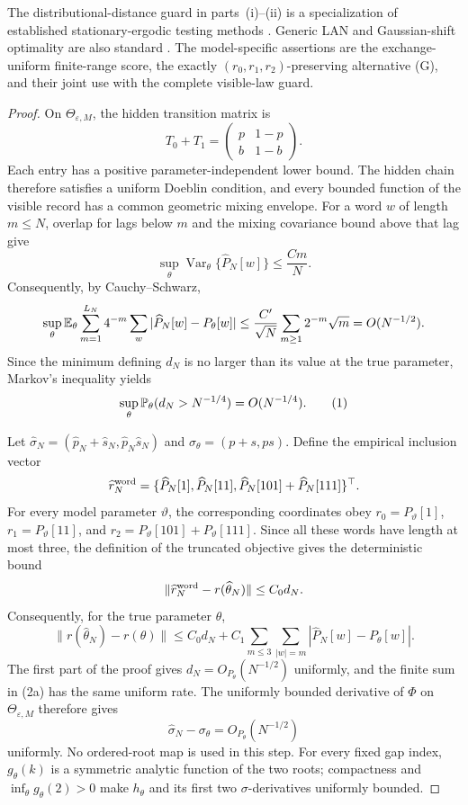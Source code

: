 \begin{paperthm}
The distributional-distance guard in parts~\textup{(i)}--\textup{(ii)} is a
specialization of established stationary-ergodic testing methods
\cite{RyabkoRyabko2010ErgodicInference,Ryabko2012StationaryTesting}.  Generic
LAN and Gaussian-shift optimality are also standard
\cite{vanDerVaart1998AsymptoticStatistics}.  The model-specific assertions are
the exchange-uniform finite-range score, the exactly
$(r_0,r_1,r_2)$-preserving alternative \textup{(G)}, and their joint use with
the complete visible-law guard.
\end{paperthm}

\begin{proof}
On $\Theta_{\varepsilon,M}$, the hidden transition matrix is
\[
T_0+T_1=\begin{pmatrix}p&1-p\\b&1-b\end{pmatrix}.
\]
Each entry has a positive parameter-independent lower bound.  The hidden chain
therefore satisfies a uniform Doeblin condition, and every bounded function of
the visible record has a common geometric mixing envelope.  For a word $w$
of length $m\le N$, overlap for lags below $m$ and the mixing covariance
bound above that lag give
\[
\sup_\theta\operatorname{Var}_\theta\{\widehat P_N[w]\}
\le \frac{Cm}{N}.
\]
Consequently, by Cauchy--Schwarz,
\[
\sup_\theta\mathbb{E}_\theta
\sum_{m=1}^{L_N}4^{-m}\sum_w
|\widehat P_N[w]-P_\theta[w]|
\le \frac{C'}{\sqrt N}
\sum_{m\ge1}2^{-m}\sqrt m=O(N^{-1/2}).
\]
Since the minimum defining $d_N$ is no larger than its value at the true
parameter, Markov's inequality yields
\[
\sup_\theta\mathbb{P}_\theta(d_N>N^{-1/4})=O(N^{-1/4}).
\tag{1}
\]

Let $\widehat\sigma_N=(\widehat p_N+\widehat s_N,
\widehat p_N\widehat s_N)$ and $\sigma_\theta=(p+s,ps)$.  Define the empirical
inclusion vector
\[
\widehat r_N^{\rm word}
=\{\widehat P_N[1],\widehat P_N[11],
\widehat P_N[101]+\widehat P_N[111]\}^\top.
\]
For every model parameter $\vartheta$, the corresponding coordinates obey
$r_0=P_\vartheta[1]$, $r_1=P_\vartheta[11]$, and
$r_2=P_\vartheta[101]+P_\vartheta[111]$.  Since all these words have length at
most three, the definition of the truncated objective gives the deterministic
bound
\[
\|\widehat r_N^{\rm word}-r(\widehat\theta_N)\|
\le C_0d_N.
\]
Consequently, for the true parameter $\theta$,
\[
\|r(\widehat\theta_N)-r(\theta)\|
\le C_0d_N+C_1\sum_{m\le3}\sum_{|w|=m}
|\widehat P_N[w]-P_\theta[w]|.
\tag{2a}
\]
The first part of the proof gives $d_N=O_{P_\theta}(N^{-1/2})$ uniformly,
and the finite sum in \textup{(2a)} has the same uniform rate.  The uniformly
bounded derivative of $\Phi$ on $\Theta_{\varepsilon,M}$ therefore gives
\[
\widehat\sigma_N-\sigma_\theta=O_{P_\theta}(N^{-1/2})
\tag{2}
\]
uniformly.  No ordered-root map is used in this step.  For every fixed gap
index, $g_\theta(k)$ is a symmetric analytic function of the two roots;
compactness and $\inf_\theta g_\theta(2)>0$ make $h_\theta$ and its first
two $\sigma$-derivatives uniformly bounded.


\end{proof}
